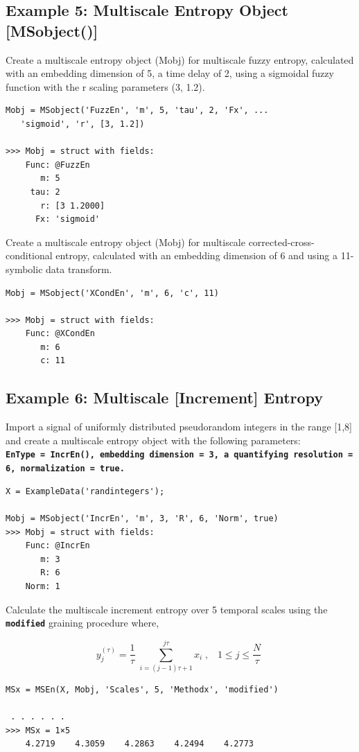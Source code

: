 \documentclass[12pt, a4paper, titlepage, openany]{book}
\begin{document}
\newpage
\subsection{\normalsize Example 5: \hspace{15mm} Multiscale Entropy Object [MSobject()]} \label{ExMobjM}
\noindent Create a multiscale entropy object (Mobj) for multiscale fuzzy entropy, calculated with an embedding dimension of 5, a time delay of 2, using a sigmoidal fuzzy function with the r scaling parameters (3, 1.2).
\begin{verbatim}
Mobj = MSobject('FuzzEn', 'm', 5, 'tau', 2, 'Fx', ...
   'sigmoid', 'r', [3, 1.2])

>>> Mobj = struct with fields:
    Func: @FuzzEn
       m: 5
     tau: 2
       r: [3 1.2000]
      Fx: 'sigmoid'
\end{verbatim}
Create a multiscale entropy object (Mobj) for multiscale corrected-cross-conditional entropy, calculated with an embedding dimension of 6 and using a 11-symbolic data transform.
\begin{verbatim}
Mobj = MSobject('XCondEn', 'm', 6, 'c', 11)

>>> Mobj = struct with fields:
    Func: @XCondEn
       m: 6
       c: 11
\end{verbatim}


\newpage
\subsection{\normalsize Example 6: \hspace{15mm} Multiscale [Increment] Entropy}
\noindent Import a signal of uniformly distributed pseudorandom integers in the range [1,8] and create a multiscale entropy object with the following parameters:\\
\textbf{\texttt{EnType =  IncrEn(), embedding dimension = 3, a quantifying resolution = 6, normalization = true.}}
\begin{verbatim}
X = ExampleData('randintegers');

Mobj = MSobject('IncrEn', 'm', 3, 'R', 6, 'Norm', true)
>>> Mobj = struct with fields:
    Func: @IncrEn
       m: 3
       R: 6
    Norm: 1
\end{verbatim}    
Calculate the multiscale increment entropy over 5 temporal scales using the \texttt{\textbf{modified}} graining procedure where,
\begin{par}
$$y_j^{\left(\tau \right)} =\frac{1}{\tau }\;\sum_{i=\left(j-1\right)\tau +1}^{j\tau } x_i \;,\;\;\;1\le j\le \frac{N}{\tau }\;$$
\end{par}
\begin{verbatim}
MSx = MSEn(X, Mobj, 'Scales', 5, 'Methodx', 'modified')

 . . . . . .
>>> MSx = 1×5
    4.2719    4.3059    4.2863    4.2494    4.2773
\end{verbatim}
\end{document}
